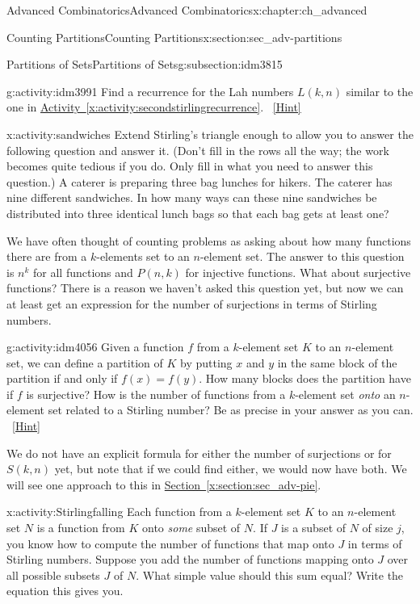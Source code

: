 \documentclass[oneside,10pt,]{book}
\numberwithin{equation}{chapter}
\begin{document}
\begin{chapterptx}{Advanced Combinatorics}{}{Advanced Combinatorics}{}{}{x:chapter:ch_advanced}
\begin{sectionptx}{Counting Partitions}{}{Counting Partitions}{}{}{x:section:sec_adv-partitions}
\begin{subsectionptx}{Partitions of Sets}{}{Partitions of Sets}{}{}{g:subsection:idm3815}
\begin{activity}{}{g:activity:idm3991}%
Find a recurrence for the Lah numbers \(L(k,n)\) similar to the one in \hyperref[x:activity:secondstirlingrecurrence]{Activity~\ref{x:activity:secondstirlingrecurrence}}.%
\qquad~\hfill{\tiny\hyperlink{g:hint:idm3996-back}{[Hint]}}\end{activity}
\begin{activity}{}{x:activity:sandwiches}%
Extend Stirling's triangle enough to allow you to answer the following question and answer it. (Don't fill in the rows all the way; the work becomes quite tedious if you do. Only fill in what you need to answer this question.) A caterer is preparing three bag lunches for hikers. The caterer has nine different sandwiches. In how many ways can these nine sandwiches be distributed into three identical lunch bags so that each bag gets at least one?%
\end{activity}
We have often thought of counting problems as asking about how many functions there are from a \(k\)-elements set to an \(n\)-element set.  The answer to this question is \(n^k\) for all functions and \(P(n,k)\) for injective functions.  What about surjective functions?  There is a reason we haven't asked this question yet, but now we can at least get an expression for the number of surjections in terms of Stirling numbers.%
\begin{activity}{}{g:activity:idm4056}%
Given a function \(f\) from a \(k\)-element set \(K\) to an \(n\)-element set, we can define a partition of \(K\) by putting \(x\) and \(y\) in the same block of the partition if and only if \(f(x)=f(y)\). How many blocks does the partition have if \(f\) is surjective? How is the number of functions from a \(k\)-element set \emph{onto} an \(n\)-element set related to a Stirling number? Be as precise in your answer as you can.%
\qquad~\hfill{\tiny\hyperlink{g:hint:idm4077-back}{[Hint]}}\end{activity}
We do not have an explicit formula for either the number of surjections or for \(S(k,n)\) yet, but note that if we could find either, we would now have both.  We will see one approach to this in \hyperref[x:section:sec_adv-pie]{Section~\ref{x:section:sec_adv-pie}}.%
\begin{activity}{}{x:activity:Stirlingfalling}%
Each function from a \(k\)-element set \(K\) to an \(n\)-element set \(N\) is a function from \(K\) onto \emph{some} subset of \(N\). If \(J\) is a subset of \(N\) of size \(j\), you know how to compute the number of functions that map onto \(J\) in terms of Stirling numbers. Suppose you add the number of functions mapping onto \(J\) over all possible subsets \(J\) of \(N\). What simple value should this sum equal? Write the equation this gives you.%

\end{activity}
\end{subsectionptx}
\end{sectionptx}
\end{chapterptx}
\end{document}

